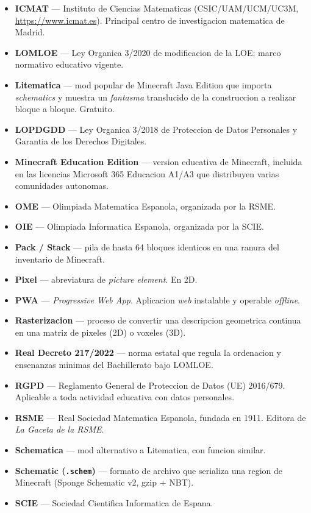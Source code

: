 \documentclass[12pt,a4paper]{scrartcl}
\newcommand{\acc}[1]{\textcolor{accent}{\textbf{#1}}}
\begin{document}
\begin{itemize}[leftmargin=1.4em,itemsep=0.3em,topsep=0.3em]
  \item \acc{ICMAT} --- Instituto de Ciencias Matematicas (CSIC/UAM/UCM/UC3M, \url{https://www.icmat.es}). Principal centro de investigacion matematica de Madrid.
  \item \acc{LOMLOE} --- Ley Organica 3/2020 de modificacion de la LOE; marco normativo educativo vigente.
  \item \acc{Litematica} --- mod popular de Minecraft Java Edition que importa \emph{schematics} y muestra un \emph{fantasma} translucido de la construccion a realizar bloque a bloque. Gratuito.
  \item \acc{LOPDGDD} --- Ley Organica 3/2018 de Proteccion de Datos Personales y Garantia de los Derechos Digitales.
  \item \acc{Minecraft Education Edition} --- version educativa de Minecraft, incluida en las licencias Microsoft 365 Educacion A1/A3 que distribuyen varias comunidades autonomas.
  \item \acc{OME} --- Olimpiada Matematica Espanola, organizada por la RSME.
  \item \acc{OIE} --- Olimpiada Informatica Espanola, organizada por la SCIE.
  \item \acc{Pack / Stack} --- pila de hasta 64 bloques identicos en una ranura del inventario de Minecraft.
  \item \acc{Pixel} --- abreviatura de \emph{picture element}. En 2D.
  \item \acc{PWA} --- \emph{Progressive Web App}. Aplicacion \emph{web} instalable y operable \emph{offline}.
  \item \acc{Rasterizacion} --- proceso de convertir una descripcion geometrica continua en una matriz de pixeles (2D) o voxeles (3D).
  \item \acc{Real Decreto 217/2022} --- norma estatal que regula la ordenacion y ensenanzas minimas del Bachillerato bajo LOMLOE.
  \item \acc{RGPD} --- Reglamento General de Proteccion de Datos (UE) 2016/679. Aplicable a toda actividad educativa con datos personales.
  \item \acc{RSME} --- Real Sociedad Matematica Espanola, fundada en 1911. Editora de \emph{La Gaceta de la RSME}.
  \item \acc{Schematica} --- mod alternativo a Litematica, con funcion similar.
  \item \acc{Schematic (\texttt{.schem})} --- formato de archivo que serializa una region de Minecraft (Sponge Schematic v2, gzip + NBT).
  \item \acc{SCIE} --- Sociedad Cientifica Informatica de Espana.

\end{itemize}
\end{document}
